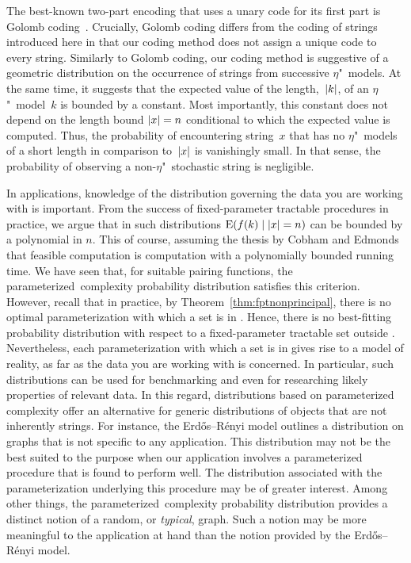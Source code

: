 The best-known two-part encoding that uses a unary code for its first part is Golomb coding~\parencite{golomb1966run-length,sayood2017introduction}.
Crucially, Golomb coding differs from the coding of strings introduced here in that our coding method does not assign a unique code to every string.
Similarly to Golomb coding, our coding method is suggestive of a geometric distribution on the occurrence of strings from successive $\eta$"~models.
At the same time, it suggests that the expected value of the length,~${\lvert k\rvert}$, of an $\eta$"~model~$k$ is bounded by a constant.
Most importantly, this constant does not depend on the length bound ${\lvert x\rvert} = n$ conditional to which the expected value is computed.
Thus, the probability of encountering string~$x$ that has no $\eta$"~models of a short length in comparison to~${\lvert x\rvert}$ is vanishingly small.
In that sense, the probability of observing a non-$\eta$"~stochastic string is negligible.

In applications, knowledge of the distribution governing the data you are working with is important.
From the success of fixed-parameter tractable procedures in practice, we argue that in such distributions $\operatorname*{E}(f(k) \mid {\lvert x\rvert} = n)$ can be bounded by a polynomial in $n$.
This of course, assuming the thesis by Cobham and Edmonds that feasible computation is computation with a polynomially bounded running time.
We have seen that, for suitable pairing functions, the parameterized~complexity probability distribution satisfies this criterion.
However, recall that in practice, by Theorem~\ref{thm:fptnonprincipal}, there is no optimal parameterization with which a set is in .
Hence, there is no best-fitting probability distribution with respect to a fixed-parameter tractable set outside .
Nevertheless, each parameterization with which a set is in  gives rise to a model of reality, as far as the data you are working with is concerned.
In particular, such distributions can be used for benchmarking and even for researching likely properties of relevant data.
In this regard, distributions based on parameterized complexity offer an alternative for generic distributions of objects that are not inherently strings.
For instance, the Erd{\H{o}}s--R{\'e}nyi model \parencite{erdos1959random,gilbert1959random} outlines a distribution on graphs that is not specific to any application.
This distribution may not be the best suited to the purpose when our application involves a parameterized procedure that is found to perform well.
The distribution associated with the parameterization underlying this procedure may be of greater interest.
Among other things, the parameterized~complexity probability distribution provides a distinct notion of a random, or \emph{typical}, graph.
Such a notion may be more meaningful to the application at hand than the notion provided by the Erd{\H{o}}s--R{\'e}nyi model.

